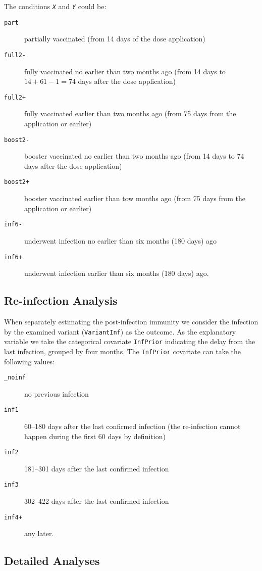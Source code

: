 \documentclass[9pt,onecolumn,twoside,lineno]{article}
\def\m{\em}
\begin{document}
The conditions {\tt {\m X}} and {\tt {\m Y}}  could be:
\begin{description}
\item[{\tt part}] partially vaccinated (from 14 days of the dose application)
\item[{\tt full2-}] fully vaccinated no earlier than two months ago (from 14 days to $14+61-1=74$ days after the dose application)
\item[{\tt full2+}] fully vaccinated earlier than two months ago (from 75 days from the application or earlier)
\item[{\tt boost2-}] booster vaccinated no earlier than two months ago (from 14 days to $74$ days after the dose application)
\item[{\tt boost2+}] booster vaccinated earlier than tow months ago (from 75 days from the application or earlier)
\item[{\tt inf6-}] underwent infection no earlier than six months (180 days) ago 
\item[{\tt inf6+}] underwent infection earlier than six months (180 days) ago. \end{description}

\subsection*{Re-infection Analysis}

When separately estimating the post-infection immunity we consider the infection by the examined variant ({\tt VariantInf}) as the outcome. As the explanatory variable we take the categorical covariate {\tt InfPrior} indicating the delay from the last infection, grouped by four months. The {\tt InfPrior} covariate can take the following values: 
\begin{description}
\item[{\tt \_noinf}] no previous infection
\item[{\tt inf1}] 60--180 days after the last confirmed infection (the re-infection cannot happen during the first 60 days by definition)
\item[{\tt inf2}] 181--301 days after the last confirmed infection
\item[{\tt inf3}] 302--422 days after the last confirmed infection
\item[{\tt inf4+}] any later.
\end{description}

\subsection*{Detailed Analyses}
\end{document}
